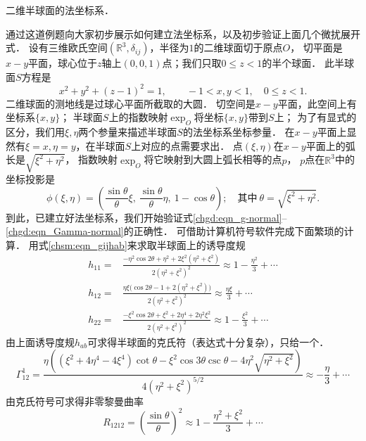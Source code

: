 \begin{example}
    二维半球面的法坐标系．
\end{example}

通过这道例题向大家初步展示如何建立法坐标系，以及初步验证上面几个微扰展开式．
设有三维欧氏空间$(\mathbb{R}^3,\delta_{ij})$，半径为$1$的二维球面切于原点$O$，
切平面是$x-y$平面，球心位于$z$轴上$(0,0,1)$点；我们只取$0\leqslant z <1$的半个球面．
此半球面$S$方程是
\begin{equation}
    x^2+y^2 + (z-1)^2 = 1, \qquad -1<x,y< 1,\quad 0\leqslant z <1 .
\end{equation}
二维球面的测地线是过球心平面所截取的大圆．
切空间是$x-y$平面，此空间上有坐标系$\{x,y\}$；
半球面$S$上的指数映射$\exp_O$将坐标$\{x,y\}$带到$S$上；
为了有显式的区分，我们用$\xi,\eta$两个参量来描述半球面$S$的法坐标系坐标参量．
在$x-y$平面上显然有$\xi=x, \eta=y$，在半球面$S$上对应的点需要求出．
点$(\xi,\eta)$在$x-y$平面上的弧长是$\sqrt{\xi^2 +\eta^2}$，
指数映射$\exp_O$将它映射到大圆上弧长相等的点$p$，
$p$点在$\mathbb{R}^3$中的坐标投影是
\begin{equation}
    \phi(\xi,\eta)=\left(\frac{ \sin \theta}{\theta }\xi,\
      \frac{ \sin \theta}{\theta}\eta,\  1-\cos\theta \right); \quad
      \text{其中}\ \theta = \sqrt{\xi^2 +\eta^2} .
\end{equation}
到此，已建立好法坐标系，我们开始验证式\eqref{chgd:eqn_g-normal}--\eqref{chgd:eqn_Gamma-normal}的正确性．
可借助计算机符号软件完成下面繁琐的计算．
用式\eqref{chsm:eqn_gijhab}来求取半球面上的诱导度规
\begin{align}
     h_{11}=& \frac{- \eta ^2 \cos 2\theta + \eta ^2
         +2 \xi ^2 \left(\eta ^2+\xi ^2\right)}{2 \left(\eta ^2+\xi ^2\right)^2}
         \approx 1-\frac{\eta ^2}{3} +\cdots \\
     h_{12}=& \frac{\eta  \xi  \bigl( \cos 2\theta-1
         +2 (\eta ^2+\xi ^2)\bigr)}{2 \left(\eta ^2+\xi ^2\right)^2}
         \approx\frac{\eta  \xi }{3} +\cdots \\
     h_{22}=& \frac{- \xi ^2 \cos 2\theta + \xi ^2
         +2 \eta ^4+2 \eta ^2 \xi ^2}{2 \left(\eta ^2+\xi ^2\right)^2}
         \approx1-\frac{\xi ^2}{3} +\cdots
\end{align}
由上面诱导度规$h_{ab}$可求得半球面的克氏符（表达式十分复杂），只给一个．
\begin{equation*}
    \Gamma^1_{12}=\frac{\eta  \left(\left( \xi ^2+4 \eta ^4-4 \xi ^4\right)
        \cot\theta -  \xi ^2 \cos3\theta \csc\theta
        -4 \eta ^2 \sqrt{\eta ^2+\xi ^2}\right)}
        {4  \left(\eta ^2+\xi ^2\right)^{5/2}}
       \approx-\frac{\eta}{3}+\cdots
\end{equation*}
由克氏符号可求得非零黎曼曲率 %
\begin{equation}
    R_{1212}=\left(\frac{\sin \theta}{\theta} \right)^2
     \approx 1- \frac{\eta ^2+\xi ^2}{3}  + \cdots
\end{equation}


